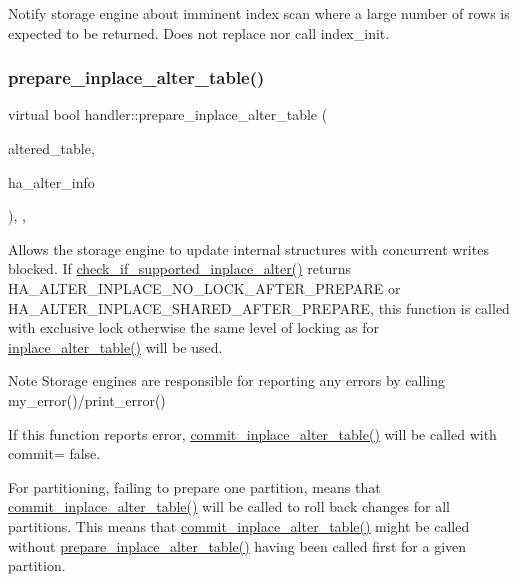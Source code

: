 Notify storage engine about imminent index scan where a large number of rows is expected to be returned. Does not replace nor call index\+\_\+init. \mbox{\label{classhandler_ab25b3931a457f1821ba55ae9cce79d98}} 
\subsubsection{\texorpdfstring{prepare\+\_\+inplace\+\_\+alter\+\_\+table()}{prepare\_inplace\_alter\_table()}}
{\footnotesize\ttfamily virtual bool handler\+::prepare\+\_\+inplace\+\_\+alter\+\_\+table (\begin{DoxyParamCaption}\item[{\mbox{\hyperlink{structTABLE}{T\+A\+B\+LE}} $\ast$}]{altered\+\_\+table,  }\item[{\mbox{\hyperlink{classAlter__inplace__info}{Alter\+\_\+inplace\+\_\+info}} $\ast$}]{ha\+\_\+alter\+\_\+info }\end{DoxyParamCaption})\hspace{0.3cm}{\ttfamily [inline]}, {\ttfamily [protected]}, {\ttfamily [virtual]}}

Allows the storage engine to update internal structures with concurrent writes blocked. If \mbox{\hyperlink{classhandler_a67890a9deb89b9ef0128601e7687fcba}{check\+\_\+if\+\_\+supported\+\_\+inplace\+\_\+alter()}} returns H\+A\+\_\+\+A\+L\+T\+E\+R\+\_\+\+I\+N\+P\+L\+A\+C\+E\+\_\+\+N\+O\+\_\+\+L\+O\+C\+K\+\_\+\+A\+F\+T\+E\+R\+\_\+\+P\+R\+E\+P\+A\+RE or H\+A\+\_\+\+A\+L\+T\+E\+R\+\_\+\+I\+N\+P\+L\+A\+C\+E\+\_\+\+S\+H\+A\+R\+E\+D\+\_\+\+A\+F\+T\+E\+R\+\_\+\+P\+R\+E\+P\+A\+RE, this function is called with exclusive lock otherwise the same level of locking as for \mbox{\hyperlink{classhandler_a90b4c3a8fe1c89c6ccfec1f4b144754a}{inplace\+\_\+alter\+\_\+table()}} will be used.

\begin{DoxyNote}{Note}
Storage engines are responsible for reporting any errors by calling my\+\_\+error()/print\+\_\+error()

If this function reports error, \mbox{\hyperlink{classhandler_a0786a5f57ccd3c97bff07b1afeae9c06}{commit\+\_\+inplace\+\_\+alter\+\_\+table()}} will be called with commit= false.

For partitioning, failing to prepare one partition, means that \mbox{\hyperlink{classhandler_a0786a5f57ccd3c97bff07b1afeae9c06}{commit\+\_\+inplace\+\_\+alter\+\_\+table()}} will be called to roll back changes for all partitions. This means that \mbox{\hyperlink{classhandler_a0786a5f57ccd3c97bff07b1afeae9c06}{commit\+\_\+inplace\+\_\+alter\+\_\+table()}} might be called without \mbox{\hyperlink{classhandler_ab25b3931a457f1821ba55ae9cce79d98}{prepare\+\_\+inplace\+\_\+alter\+\_\+table()}} having been called first for a given partition.
\end{DoxyNote}

